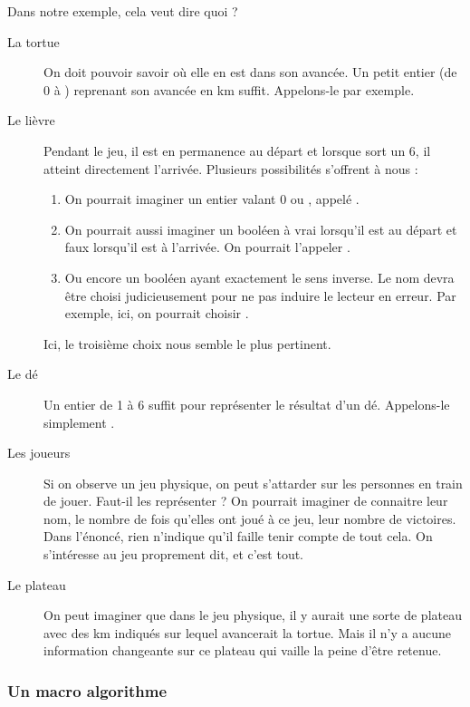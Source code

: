 			Dans notre exemple, cela veut dire quoi ?
			\begin{description}
			\item[La tortue]
				On doit pouvoir savoir où elle en est dans son avancée.
				Un petit entier (de 0 à \nbMaxKmTortue{}) reprenant son avancée en km suffit.
				Appelons-le  par exemple.
			\item[Le lièvre]
				Pendant le jeu, il est en permanence au départ
				et lorsque sort un 6, il atteint directement l'arrivée.
				Plusieurs possibilités s'offrent à nous :
			
				\begin{enumerate}
				\item
					On pourrait imaginer un entier valant 0 ou \nbMaxKmTortue{},
					appelé .
				\item
					On pourrait aussi imaginer un booléen à vrai 
					lorsqu'il est au départ et faux lorsqu'il est à l'arrivée.
					On pourrait l'appeler .
				\item
					Ou encore un booléen ayant exactement le sens inverse.
					Le nom devra être choisi judicieusement pour ne pas induire
					le lecteur en erreur.
					Par exemple, ici, on pourrait choisir .
				\end{enumerate}
				
				Ici, le troisième choix nous semble le plus pertinent.
			\item[Le dé]
				Un entier de 1 à 6 suffit pour représenter le résultat d'un dé.
				Appelons-le simplement .
			\item[Les joueurs]
				Si on observe un jeu physique,
				on peut s'attarder sur les personnes en train de jouer.
				Faut-il les représenter ?
				On pourrait imaginer de connaitre leur nom,
				le nombre de fois qu'elles ont joué à ce jeu,
				leur nombre de victoires.
				Dans l'énoncé, 
				rien n'indique qu'il faille tenir compte de tout cela. 
				On s'intéresse au jeu proprement dit, et c'est tout.
			\item[Le plateau]
				On peut imaginer que dans le jeu physique,
				il y aurait une sorte de plateau 
				avec des km indiqués
				sur lequel avancerait la tortue.
				Mais il n'y a aucune information changeante
				sur ce plateau qui vaille la peine d'être retenue.
			\end{description}

		\subsubsection*{Un macro algorithme}
				
